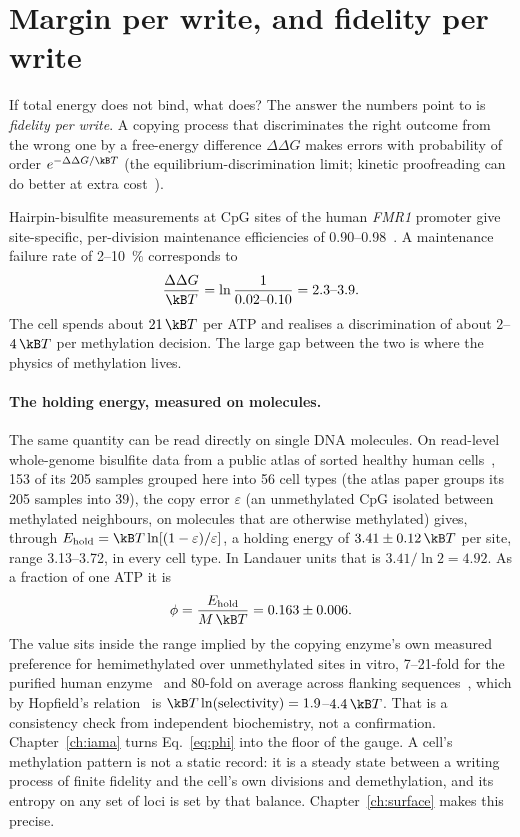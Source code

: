 \section{Margin per write, and fidelity per write}

If total energy does not bind, what does? The answer the numbers point to is \emph{fidelity per
write}. A copying process that discriminates the right outcome from the wrong one by a free-energy
difference $\Delta\Delta G$ makes errors with probability of order $e^{-\Delta\Delta G/\kB T}$
(the equilibrium-discrimination limit; kinetic proofreading can do better at extra
cost~\cite{Hopfield1974}).

Hairpin-bisulfite measurements at CpG sites of the human \emph{FMR1} promoter give site-specific, per-division
maintenance efficiencies of 0.90--0.98~\cite{Genereux2005}. \observed{} A maintenance failure rate of 2--10~\%
corresponds to
\[
  \frac{\Delta\Delta G}{\kB T}=\ln\frac{1}{0.02\text{--}0.10}=2.3\text{--}3.9 .
\]
\calc{} The cell spends about $21\,\kB T$ per ATP and realises a discrimination of about $2$--$4\,\kB T$
per methylation decision. The large gap between the two is where the physics of methylation
lives.

\paragraph{The holding energy, measured on molecules.}\label{sec:p4holding} The same quantity can be read directly on single DNA molecules.
On read-level whole-genome bisulfite data from a public atlas of sorted healthy human cells~\cite{Loyfer2023}, 153 of its 205 samples
grouped here into 56 cell types (the atlas paper groups its 205 samples into 39), the copy error $\varepsilon$
(an unmethylated CpG isolated between methylated neighbours, on molecules that are otherwise methylated) gives, through
$E_{\rm hold}=\kB T\ln[(1-\varepsilon)/\varepsilon]$, a holding energy of $3.41\pm0.12\,\kB T$ per site, range 3.13--3.72, in
every cell type. \measured{} In Landauer units that is $3.41/\ln2=4.92$. \calc{} As a fraction of one ATP it is
\begin{equation}
  \phi=\frac{E_{\rm hold}}{M\,\kB T}=0.163\pm0.006 .
  \label{eq:phi}
\end{equation}
The value sits inside the range implied by the copying enzyme's own measured preference for hemimethylated over unmethylated
sites in vitro, 7--21-fold for the purified human enzyme~\cite{Pradhan1999} and 80-fold on average across flanking
sequences~\cite{Adam2023}, which by Hopfield's relation~\cite{Hopfield1974} is $\kB T\ln(\text{selectivity})=1.9$--$4.4\,\kB T$. \calc
That is a consistency check from independent biochemistry, not a confirmation. Chapter~\ref{ch:iama} turns
Eq.~\eqref{eq:phi} into the floor of the gauge. A cell's methylation pattern is not a static record: it is a steady state between a writing
process of finite fidelity and the cell's own divisions and demethylation, and its entropy on any
set of loci is set by that balance. Chapter~\ref{ch:surface} makes this precise.

